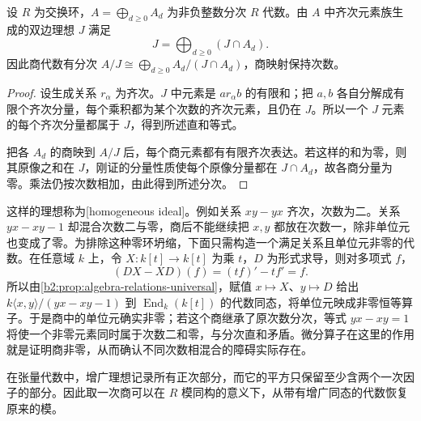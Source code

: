 \begin{proposition}\label{b2:prop:homogeneous-ideal-quotient}
	设 \(R\) 为交换环，\(A=\bigoplus_{d\ge0}A_d\) 为非负整数分次 \(R\) 代数。由 \(A\) 中齐次元素族生成的双边理想 \(J\) 满足
	\[
		J=\bigoplus_{d\ge0}(J\cap A_d).
	\]
	因此商代数有分次 \(A/J\cong\bigoplus_{d\ge0}A_d/(J\cap A_d)\)，商映射保持次数。
\end{proposition}
\begin{proof}
	设生成关系 \(r_\alpha\) 为齐次。\(J\) 中元素是 \(a r_\alpha b\) 的有限和；把 \(a,b\) 各自分解成有限个齐次分量，每个乘积都为某个次数的齐次元素，且仍在 \(J\)。所以一个 \(J\) 元素的每个齐次分量都属于 \(J\)，得到所述直和等式。

	把各 \(A_d\) 的商映到 \(A/J\) 后，每个商元素都有有限齐次表达。若这样的和为零，则其原像之和在 \(J\)，刚证的分量性质使每个原像分量都在 \(J\cap A_d\)，故各商分量为零。乘法仍按次数相加，由此得到所述分次。
\end{proof}

这样的理想称为[homogeneous ideal]。例如关系 \(xy-yx\) 齐次，次数为二。关系 \(yx-xy-1\) 却混合次数二与零，商后不能继续把 \(x,y\) 都放在次数一，除非单位元也变成了零。为排除这种零环坍缩，下面只需构造一个满足关系且单位元非零的代数。在任意域 \(k\) 上，令 \(X:k[t]\rightarrow k[t]\) 为乘 \(t\)，\(D\) 为形式求导，则对多项式 \(f\)，
\[
	(DX-XD)(f)=(tf)'-tf'=f.
\]
所以由\cref{b2:prop:algebra-relations-universal}，赋值 \(x\mapsto X\)、\(y\mapsto D\) 给出 \(k\langle x,y\rangle/(yx-xy-1)\) 到 \(\operatorname{End}_k(k[t])\) 的代数同态，将单位元映成非零恒等算子。于是商中的单位元确实非零；若这个商继承了原次数分次，等式 \(yx-xy=1\) 将使一个非零元素同时属于次数二和零，与分次直和矛盾。微分算子在这里的作用就是证明商非零，从而确认不同次数相混合的障碍实际存在。

\ProseParagraphBreak
在张量代数中，增广理想记录所有正次部分，而它的平方只保留至少含两个一次因子的部分。因此取一次商可以在 \(R\) 模同构的意义下，从带有增广同态的代数恢复原来的模。

